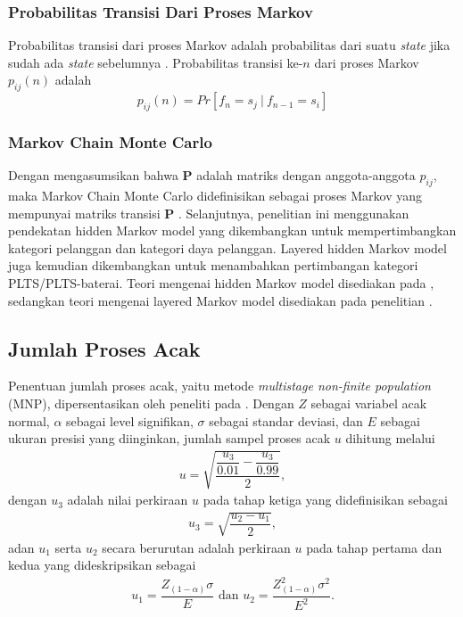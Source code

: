 {{{{{{\subsubsection{Probabilitas Transisi Dari Proses Markov}
Probabilitas transisi dari proses Markov adalah probabilitas dari suatu \textit{state} jika sudah ada \textit{state} sebelumnya \cite{Revuz1984}. Probabilitas transisi ke-$n$ dari proses Markov $p_{ij}(n)$ adalah
\begin{equation}
p_{ij}(n)=Pr[f_n=s_j\ |\ f_{n-1}=s_i]\label{tp1}
\end{equation}
\subsubsection{Markov Chain Monte Carlo}
Dengan mengasumsikan bahwa $\mathbf{P}$ adalah matriks dengan anggota-anggota $p_{ij}$, maka Markov Chain Monte Carlo didefinisikan sebagai proses Markov yang mempunyai matriks transisi $\mathbf{P}$ \cite{Revuz1984}. Selanjutnya, penelitian ini menggunakan pendekatan hidden Markov model yang dikembangkan untuk mempertimbangkan kategori pelanggan dan kategori daya pelanggan. Layered hidden Markov model juga kemudian dikembangkan untuk menambahkan pertimbangan kategori PLTS/PLTS-baterai. Teori mengenai hidden Markov model disediakan pada \cite{Upper1997}, sedangkan teori mengenai layered Markov model disediakan pada penelitian \cite{Penagarikano2004}.
\subsection{Jumlah Proses Acak}
Penentuan jumlah proses acak, yaitu metode \textit{multistage non-finite population} (MNP), dipersentasikan oleh peneliti pada \cite{Louangrath2014}. Dengan $Z$ sebagai variabel acak normal, $\alpha$ sebagai level signifikan, $\sigma$ sebagai standar deviasi, dan $E$ sebagai ukuran presisi yang diinginkan, jumlah sampel proses acak $u$ dihitung melalui
\begin{align}\label{mnp1}
u=\sqrt{\dfrac{\dfrac{u_3}{0.01}-\dfrac{u_3}{0.99}}{2}},
\end{align}
dengan $u_3$ adalah nilai perkiraan $u$ pada tahap ketiga yang didefinisikan sebagai
\begin{align}\label{mnp2}
u_3=\sqrt{\dfrac{u_2-u_1}{2}},
\end{align}
adan $u_1$ serta $u_2$ secara berurutan adalah perkiraan $u$ pada tahap pertama dan kedua yang dideskripsikan sebagai  
\begin{align}\label{mnp3}
	u_1=\dfrac{Z_{(1-\alpha)}\sigma}{E}\text{ dan }u_2=\dfrac{Z_{(1-\alpha)}^2\sigma^2}{E^2}.
\end{align}

}}}}}}
